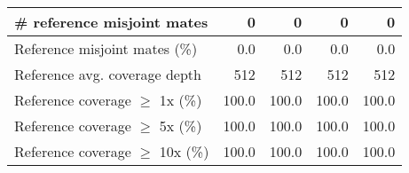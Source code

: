 \documentclass[12pt,a4paper]{article}
\begin{document}
\begin{table}[ht]
\begin{center}
\begin{tabular}{|l*{4}{|r}|}
\# reference misjoint mates & 0 & 0 & 0 & 0 \\ \hline
Reference misjoint mates (\%) & 0.0 & 0.0 & 0.0 & 0.0 \\ \hline
Reference avg. coverage depth & 512 & 512 & 512 & 512 \\ \hline
Reference coverage $\geq$ 1x (\%) & 100.0 & 100.0 & 100.0 & 100.0 \\ \hline
Reference coverage $\geq$ 5x (\%) & 100.0 & 100.0 & 100.0 & 100.0 \\ \hline
Reference coverage $\geq$ 10x (\%) & 100.0 & 100.0 & 100.0 & 100.0 \\ \hline
\end{tabular}
\end{center}
\end{table}
\end{document}
